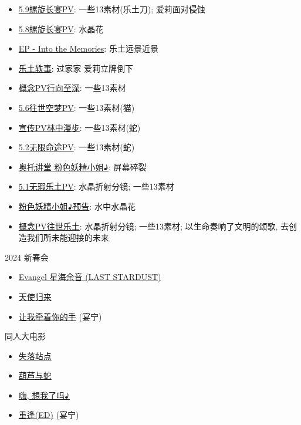 \documentclass[a4paper]{article}
\begin{document}
\begin{itemize}
    \item \href{https://www.bilibili.com/video/BV1Ra411X7Hr/}{5.9螺旋长宴PV}: 一些13素材(乐土刀); 爱莉面对侵蚀
    \item \href{https://www.bilibili.com/video/BV1sP4y1F7iQ/}{5.8螺旋长宴PV}: 水晶花
    \item \href{https://www.bilibili.com/video/BV18Y4y1Y7Hc/}{EP - Into the Memories}: 乐土远景近景
    \item \href{https://www.bilibili.com/video/BV1fr4y1n787/}{乐土轶事}: 过家家 爱莉立牌倒下
    \item \href{https://www.bilibili.com/video/BV1wF411b7wo/}{概念PV行向至深}: 一些13素材
    \item \href{https://www.bilibili.com/video/BV1KL4y137Jb/}{5.6往世空梦PV}: 一些13素材(猫)
    \item \href{https://www.bilibili.com/video/BV1F341127NT/}{宣传PV林中漫步}: 一些13素材(蛇)
    \item \href{https://www.bilibili.com/video/BV1V44y1b7cf/}{5.2无限命途PV}: 一些13素材(蛇)
    \item \href{https://www.bilibili.com/video/BV1Ny4y1573D/}{奥托讲堂 粉色妖精小姐♪}: 屏幕碎裂
    \item \href{https://www.bilibili.com/video/BV1iP4y1W7Kk/}{5.1无瑕乐土PV}: 水晶折射分镜; 一些13素材
    \item \href{https://www.bilibili.com/video/BV1Nw411R7bU/}{粉色妖精小姐♪预告}: 水中水晶花
    \item \href{https://www.bilibili.com/video/BV1T64y1X7mY/}{概念PV往世乐土}: 水晶折射分镜; 一些13素材; 以生命奏响了文明的颂歌, 去创造我们所未能迎接的未来
\end{itemize}

2024 新春会

\begin{itemize}
    \item \href{https://www.bilibili.com/video/BV13c411v7DR/}{Evangel 星海余音 (LAST STARDUST)}
    \item \href{https://www.bilibili.com/video/BV1pp4y1m7Uh/}{天使归来}
    \item \href{https://www.bilibili.com/video/BV1te411h7aj/}{让我牵着你的手} (宴宁)
\end{itemize}

同人大电影

\begin{itemize}
    \item \href{https://www.bilibili.com/video/BV1Ud4y1z7mY/?t=309}{失落站点}
    \item \href{https://www.bilibili.com/video/BV1w24y1R7s9/}{葫芦与蛇}
    \item \href{https://www.bilibili.com/video/BV1LD4y117nq/}{嗨, 想我了吗♪}
    \item \href{https://www.bilibili.com/video/BV17D4y117DV/}{重逢(ED)} (宴宁)
\end{itemize}
\end{document}
